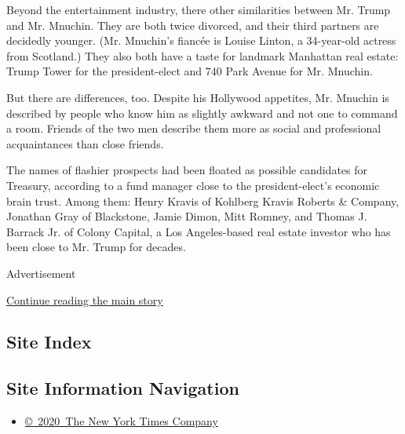 Beyond the entertainment industry, there other similarities between Mr.
Trump and Mr. Mnuchin. They are both twice divorced, and their third
partners are decidedly younger. (Mr. Mnuchin's fiancée is Louise Linton,
a 34-year-old actress from Scotland.) They also both have a taste for
landmark Manhattan real estate: Trump Tower for the president-elect and
740 Park Avenue for Mr. Mnuchin.

But there are differences, too. Despite his Hollywood appetites, Mr.
Mnuchin is described by people who know him as slightly awkward and not
one to command a room. Friends of the two men describe them more as
social and professional acquaintances than close friends.

The names of flashier prospects had been floated as possible candidates
for Treasury, according to a fund manager close to the president-elect's
economic brain trust. Among them: Henry Kravis of Kohlberg Kravis
Roberts \& Company, Jonathan Gray of Blackstone, Jamie Dimon, Mitt
Romney, and Thomas J. Barrack Jr. of Colony Capital, a Los Angeles-based
real estate investor who has been close to Mr. Trump for decades.

Advertisement

\protect\hyperlink{after-bottom}{Continue reading the main story}

\hypertarget{site-index}{%
\subsection{Site Index}\label{site-index}}

\hypertarget{site-information-navigation}{%
\subsection{Site Information
Navigation}\label{site-information-navigation}}

\begin{itemize}
\tightlist
\item
  \href{https://help.nytimes.com/hc/en-us/articles/115014792127-Copyright-notice}{©~2020~The
  New York Times Company}
\end{itemize}

